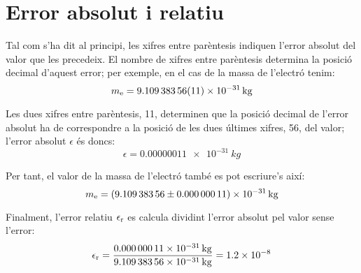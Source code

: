  
  
 
   
  
  
  
  
  
 \index{$\sigma$}  

\section{Error absolut i relatiu}\label{err_abs_rel}

Tal com s'ha dit al principi, les xifres entre parèntesis indiquen l'error absolut del valor que les precedeix. El nombre de xifres entre parèntesis determina la posició decimal d'aquest error; per exemple, en el cas de la  massa de l'electró tenim:
\[
    m\ped{e} = \SI{9,10938356(11) e-31}{kg}
\]

Les dues xifres entre parèntesis, 11, determinen que la posició decimal de l'error absolut ha de correspondre a la posició de les dues últimes xifres, 56, del valor; l'error absolut $\epsilon$  és doncs:
\[
    \epsilon = \SI{0,00000011 e-31}{kg}
\]

Per tant, el valor de la massa de l'electró també es pot escriure's així:
 \[
    m\ped{e} = \SI[separate-uncertainty]{9,10938356(11) e-31}{kg}
\]

Finalment, l'error relatiu $\epsilon\ped{r}$ es calcula dividint l'error absolut pel valor sense l'error:
\[
    \epsilon\ped{r} = \frac{\SI{0,00000011 e-31}{kg}}{\SI{9,10938356 e-31}{kg}} =   \num{1,2e-8}
\]
